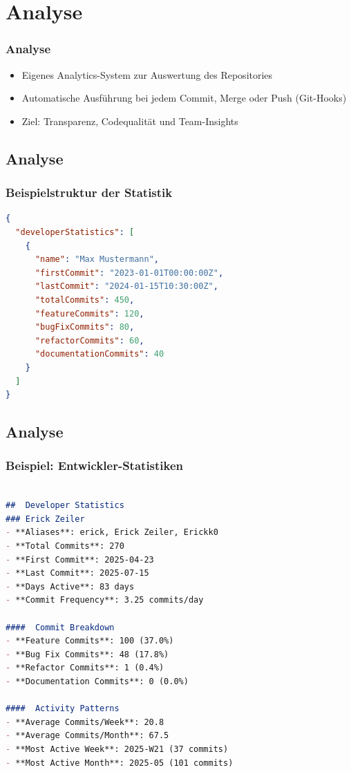 \documentclass{beamer}
\begin{document}
\section{Analyse}
\begin{frame}
\frametitle{Analyse}

\begin{itemize}
  \item Eigenes Analytics-System zur Auswertung des Repositories
  \item Automatische Ausführung bei jedem Commit, Merge oder Push (Git-Hooks)
  \item Ziel: Transparenz, Codequalität und Team-Insights
\end{itemize}
\end{frame}

\subsection{Analyse}
\begin{frame}[fragile]
\frametitle{Beispielstruktur der Statistik}
\begin{lstlisting}[language=json, basicstyle=\ttfamily\tiny, breaklines=true]
{
  "developerStatistics": [
    {
      "name": "Max Mustermann",
      "firstCommit": "2023-01-01T00:00:00Z",
      "lastCommit": "2024-01-15T10:30:00Z",
      "totalCommits": 450,
      "featureCommits": 120,
      "bugFixCommits": 80,
      "refactorCommits": 60,
      "documentationCommits": 40
    }
  ]
}
\end{lstlisting}
\end{frame}

\subsection{Analyse}
\begin{frame}[fragile]
\frametitle{Beispiel: Entwickler-Statistiken}
\begin{lstlisting}[language=markdown,basicstyle=\ttfamily\tiny,breaklines=true]

##  Developer Statistics
### Erick Zeiler
- **Aliases**: erick, Erick Zeiler, Erickk0
- **Total Commits**: 270
- **First Commit**: 2025-04-23
- **Last Commit**: 2025-07-15
- **Days Active**: 83 days
- **Commit Frequency**: 3.25 commits/day

####  Commit Breakdown
- **Feature Commits**: 100 (37.0%)
- **Bug Fix Commits**: 48 (17.8%)
- **Refactor Commits**: 1 (0.4%)
- **Documentation Commits**: 0 (0.0%)

####  Activity Patterns
- **Average Commits/Week**: 20.8
- **Average Commits/Month**: 67.5
- **Most Active Week**: 2025-W21 (37 commits)
- **Most Active Month**: 2025-05 (101 commits)

\end{lstlisting}
\end{frame}
\end{document}
